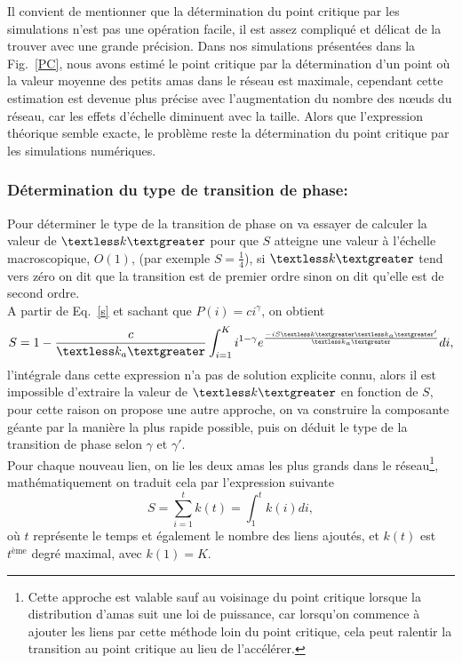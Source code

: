 Il convient de mentionner que la détermination du point critique par les simulations n'est pas une opération facile, il est assez compliqué et délicat de la trouver avec une grande précision. Dans nos simulations présentées dans la Fig.~\ref{PC}, nous avons estimé le point critique par la détermination d'un point où la valeur moyenne des petits amas dans le réseau est maximale,  cependant cette estimation est devenue plus précise avec l'augmentation du nombre des nœuds du réseau, car les effets d'échelle diminuent avec la taille. Alors que l'expression théorique semble exacte, le problème reste la détermination du point critique par les simulations numériques. 
 
 
  \subsubsection{Détermination du type de transition de phase:}
 Pour déterminer le type de la transition de phase on va essayer de calculer la valeur de $\km$ pour que $S$ atteigne une valeur à l'échelle macroscopique, $O(1)$, (par exemple $S=\frac{1}{4}$), si $\km$ tend vers zéro on dit que la transition est de premier ordre sinon on dit qu'elle est de second ordre.\\
 A partir de Eq.~\eqref{s} et sachant que $P(i)=ci^{\gamma}$, on obtient
 \begin{equation}
 S=1-\frac{c}{\kma}\int_{i=1}^Ki^{1-\gamma}e^{\frac{-iS\km\kma'}{\kma}}di
 \label{s2},
 \end{equation}
 l'intégrale dans cette expression n'a pas de solution explicite connu, alors il est impossible d'extraire la valeur de $\km$ en fonction de $S$,  pour cette raison on propose une autre approche, on va construire la composante géante par la manière la plus rapide possible, puis on déduit le type de la transition de phase selon $\gamma$ et $\gamma'$.\\
 Pour chaque nouveau lien, on lie les deux amas les plus grands dans le réseau\footnote{Cette approche est valable sauf au voisinage du point critique lorsque la distribution d'amas suit une loi de puissance, car lorsqu'on commence à ajouter les liens par cette méthode loin du point critique, cela peut ralentir  la transition au point critique au lieu de l'accélérer.}, mathématiquement on traduit cela par l'expression suivante 
  \begin{equation}
  S=\sum_{i=1}^tk(t)=\int_{1}^{t}k(i)di,
  \label{s3}
  \end{equation}
  où $t$ représente le temps et également le nombre des liens ajoutés, et $k(t)$ est $t^{\text{ème}}$ degré maximal, avec $k(1)=K$.\\
